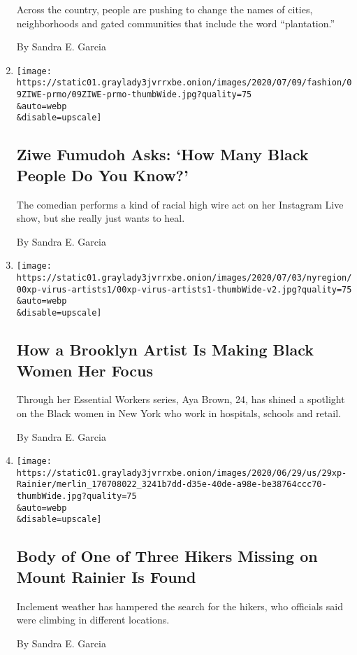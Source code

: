 \begin{enumerate}
  Across the country, people are pushing to change the names of cities,
  neighborhoods and gated communities that include the word
  ``plantation.''

  By Sandra E. Garcia
\item
  \href{/2020/07/09/style/ziwe-fumudoh-asks-how-many-black-people-do-you-know.html}{}

  \texttt{[image: https://static01.graylady3jvrrxbe.onion/images/2020/07/09/fashion/09ZIWE-prmo/09ZIWE-prmo-thumbWide.jpg?quality=75\\\&auto=webp\\\&disable=upscale]}

  \hypertarget{ziwe-fumudoh-asks-how-many-black-people-do-you-know}{%
  \subsection{Ziwe Fumudoh Asks: `How Many Black People Do You
  Know?'}\label{ziwe-fumudoh-asks-how-many-black-people-do-you-know}}

  The comedian performs a kind of racial high wire act on her Instagram
  Live show, but she really just wants to heal.

  By Sandra E. Garcia
\item
  \href{/2020/07/06/nyregion/black-women-essential-workers.html}{}

  \texttt{[image: https://static01.graylady3jvrrxbe.onion/images/2020/07/03/nyregion/00xp-virus-artists1/00xp-virus-artists1-thumbWide-v2.jpg?quality=75\\\&auto=webp\\\&disable=upscale]}

  \hypertarget{how-a-brooklyn-artist-is-making-black-women-her-focus}{%
  \subsection{How a Brooklyn Artist Is Making Black Women Her
  Focus}\label{how-a-brooklyn-artist-is-making-black-women-her-focus}}

  Through her Essential Workers series, Aya Brown, 24, has shined a
  spotlight on the Black women in New York who work in hospitals,
  schools and retail.

  By Sandra E. Garcia
\item
  \href{/2020/06/29/us/mt-rainier-missing-hikers.html}{}

  \texttt{[image: https://static01.graylady3jvrrxbe.onion/images/2020/06/29/us/29xp-Rainier/merlin\_170708022\_3241b7dd-d35e-40de-a98e-be38764ccc70-thumbWide.jpg?quality=75\\\&auto=webp\\\&disable=upscale]}

  \hypertarget{body-of-one-of-three-hikers-missing-on-mount-rainier-is-found}{%
  \subsection{Body of One of Three Hikers Missing on Mount Rainier Is
  Found}\label{body-of-one-of-three-hikers-missing-on-mount-rainier-is-found}}

  Inclement weather has hampered the search for the hikers, who
  officials said were climbing in different locations.

  By Sandra E. Garcia
\end{enumerate}

